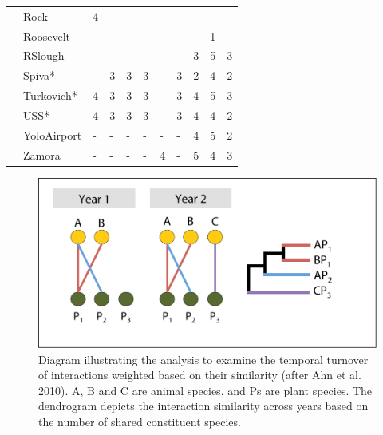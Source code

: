 \documentclass[12pt]{article}
\begin{document}
\begin{table}
\begin{tabular}{lllllllllll}
    &Rock & 4 & - & - & - & - & - & - & - & -\\
    &Roosevelt & - & - & - & - & - & - & - & 1 & -\\
    &RSlough & - & - & - & - & - & - & 3 & 5 & 3\\
    &Spiva* & - & 3 & 3 & 3 & - & 3 & 2 & 4 & 2\\
    &Turkovich* & 4 & 3 & 3 & 3 & - & 3 & 4 & 5 & 3\\
    &USS* & 4 & 3 & 3 & 3 & - & 3 & 4 & 4 & 2\\
    &YoloAirport & - & - & - & - & - & - & 4 & 5 & 2\\
    &Zamora & - & - & - & - & 4 & - & 5 & 4 & 3\\
    \hline
  \end{tabular}
  \label{tab:controls}
\end{table}
\clearpage


\begin{figure}
  \centering
  \includegraphics[width=.8\textwidth]{figures/scheme.pdf}
  \caption{Diagram illustrating the analysis to examine the temporal
    turnover of interactions weighted based on their similarity (after
    Ahn et al. 2010). A, B and C are animal species, and Ps are plant
    species. The dendrogram depicts the interaction similarity across
    years based on the number of shared constituent species.}
  \label{fig:methods}
\end{figure}
\clearpage
\end{document}
